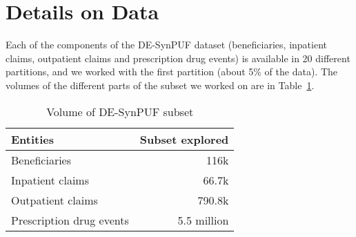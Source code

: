 \section{Details on Data}
\label{sec:data}
Each of the components of the DE-SynPUF dataset (beneficiaries, inpatient claims, outpatient claims and prescription drug events) is available in 20 different partitions, and we worked with the first partition (about 5\% of the data). The volumes of the different parts of the subset we worked on are in Table~\ref{tab:desynpuf_data}.\\

\begin{table}[ht]
\caption{Volume of DE-SynPUF subset}
\centering
\begin{tabular}{lr}
\hline
Entities & Subset explored\\
\hline
Beneficiaries & 116k\\
Inpatient claims & 66.7k\\
Outpatient claims & 790.8k\\
Prescription drug events & 5.5 million\\
\hline
\end{tabular}
\label{tab:desynpuf_data}
\end{table}

